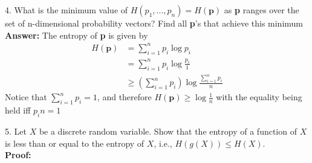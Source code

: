 \documentclass[12pt]{article}
\begin{document}
	4. What is the minimum value of $H(p_1,...,p_n) = H(\textbf{p})$ as \textbf{p} ranges over the set of n-dimensional probability vectors? Find all \textbf{p}'s that achieve this minimum \\
	\textbf{Answer:} The entropy of \textbf{p} is given by
	\begin{align*}
		H(\textbf{p}) &= \sum_{i=1}^{n}p_i\log p_i \\
					  &= \sum_{i=1}^{n}p_i\log\frac{p_i}{1} \\
					  &\geq (\sum_{i=1}^{n}p_i) \log \frac{\sum_{i=1}^{n}p_i}{n}
	\end{align*}
	Notice that $\sum_{i=1}^{n}p_i=1$, and therefore $H(\textbf{p}) \geq \log\frac{1}{n}$ with the equality being held iff $p_in = 1$ 
	\par 
	5. Let $X$ be a discrete random variable. Show that the entropy of a function of $X$ is less than or equal to the entropy of $X$, i.e., $H(g(X)) \leq H(X)$. \\
	\textbf{Proof:}
	
	
\end{document}
